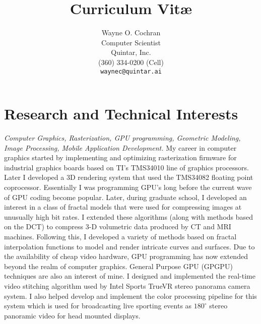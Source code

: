 \documentclass[10pt]{article}
\title{Curriculum Vit\ae}
\author{Wayne O. Cochran\\
        Computer Scientist\\
        Quintar, Inc.\\
       (360) 334-0200 (Cell) \\
       {\tt waynec@quintar.ai}}
\begin{document}
\maketitle




\section*{Research and Technical Interests}

{\em Computer Graphics, Rasterization, 
GPU programming, Geometric Modeling, Image Processing, Mobile Application Development.}
My career in computer graphics started by 
implementing and optimizing rasterization firmware
for industrial graphics boards based on
TI's TMS34010 line of graphics processors.
Later I developed a 3D rendering system
that used the TMS34082 floating  point coprocessor.
Essentially I was programming GPU's long before
the current wave of GPU coding become popular.
Later, during graduate school, I developed an interest
in a class of fractal models that were used for compressing
images at unusually high bit rates. I extended these
algorithms (along with methods based on the DCT)
to compress 3-D volumetric data produced by CT
and MRI machines. Following this, I developed a variety of methods
based on fractal interpolation functions to model
and render intricate curves and surfaces.
Due to the availability of cheap video hardware,
GPU programming
has now extended beyond the realm of computer graphics.
General Purpose GPU (GPGPU) techniques are also
an interest of mine.
I designed and implemented the real-time video stitching algorithm
used by Intel Sports TrueVR 
stereo panorama camera system. I also helped develop and implement
the color processing pipeline for this system
which is used for broadcasting live sporting events as $180^\circ$ stereo
panoramic video for head mounted displays.
\end{document}
